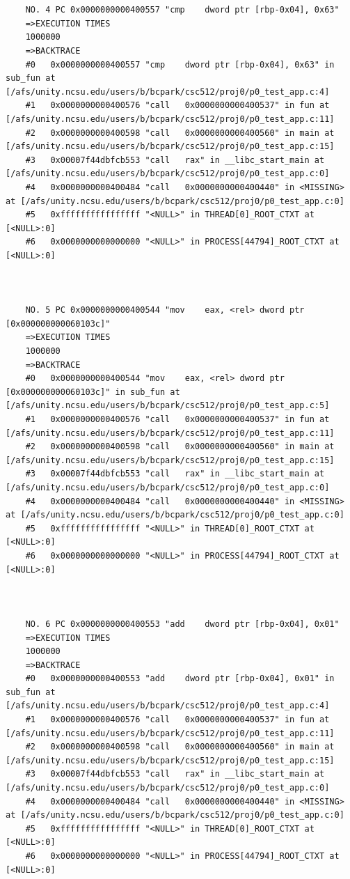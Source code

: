 \documentclass[11pt]{article}
\begin{document}
\begin{verbatim}
    
    
    NO. 4 PC 0x0000000000400557 "cmp    dword ptr [rbp-0x04], 0x63"
    =>EXECUTION TIMES
    1000000
    =>BACKTRACE
    #0   0x0000000000400557 "cmp    dword ptr [rbp-0x04], 0x63" in sub_fun at [/afs/unity.ncsu.edu/users/b/bcpark/csc512/proj0/p0_test_app.c:4]
    #1   0x0000000000400576 "call   0x0000000000400537" in fun at [/afs/unity.ncsu.edu/users/b/bcpark/csc512/proj0/p0_test_app.c:11]
    #2   0x0000000000400598 "call   0x0000000000400560" in main at [/afs/unity.ncsu.edu/users/b/bcpark/csc512/proj0/p0_test_app.c:15]
    #3   0x00007f44dbfcb553 "call   rax" in __libc_start_main at [/afs/unity.ncsu.edu/users/b/bcpark/csc512/proj0/p0_test_app.c:0]
    #4   0x0000000000400484 "call   0x0000000000400440" in <MISSING> at [/afs/unity.ncsu.edu/users/b/bcpark/csc512/proj0/p0_test_app.c:0]
    #5   0xffffffffffffffff "<NULL>" in THREAD[0]_ROOT_CTXT at [<NULL>:0]
    #6   0x0000000000000000 "<NULL>" in PROCESS[44794]_ROOT_CTXT at [<NULL>:0]
    
    
    
    NO. 5 PC 0x0000000000400544 "mov    eax, <rel> dword ptr [0x000000000060103c]"
    =>EXECUTION TIMES
    1000000
    =>BACKTRACE
    #0   0x0000000000400544 "mov    eax, <rel> dword ptr [0x000000000060103c]" in sub_fun at [/afs/unity.ncsu.edu/users/b/bcpark/csc512/proj0/p0_test_app.c:5]
    #1   0x0000000000400576 "call   0x0000000000400537" in fun at [/afs/unity.ncsu.edu/users/b/bcpark/csc512/proj0/p0_test_app.c:11]
    #2   0x0000000000400598 "call   0x0000000000400560" in main at [/afs/unity.ncsu.edu/users/b/bcpark/csc512/proj0/p0_test_app.c:15]
    #3   0x00007f44dbfcb553 "call   rax" in __libc_start_main at [/afs/unity.ncsu.edu/users/b/bcpark/csc512/proj0/p0_test_app.c:0]
    #4   0x0000000000400484 "call   0x0000000000400440" in <MISSING> at [/afs/unity.ncsu.edu/users/b/bcpark/csc512/proj0/p0_test_app.c:0]
    #5   0xffffffffffffffff "<NULL>" in THREAD[0]_ROOT_CTXT at [<NULL>:0]
    #6   0x0000000000000000 "<NULL>" in PROCESS[44794]_ROOT_CTXT at [<NULL>:0]
    
    
    
    NO. 6 PC 0x0000000000400553 "add    dword ptr [rbp-0x04], 0x01"
    =>EXECUTION TIMES
    1000000
    =>BACKTRACE
    #0   0x0000000000400553 "add    dword ptr [rbp-0x04], 0x01" in sub_fun at [/afs/unity.ncsu.edu/users/b/bcpark/csc512/proj0/p0_test_app.c:4]
    #1   0x0000000000400576 "call   0x0000000000400537" in fun at [/afs/unity.ncsu.edu/users/b/bcpark/csc512/proj0/p0_test_app.c:11]
    #2   0x0000000000400598 "call   0x0000000000400560" in main at [/afs/unity.ncsu.edu/users/b/bcpark/csc512/proj0/p0_test_app.c:15]
    #3   0x00007f44dbfcb553 "call   rax" in __libc_start_main at [/afs/unity.ncsu.edu/users/b/bcpark/csc512/proj0/p0_test_app.c:0]
    #4   0x0000000000400484 "call   0x0000000000400440" in <MISSING> at [/afs/unity.ncsu.edu/users/b/bcpark/csc512/proj0/p0_test_app.c:0]
    #5   0xffffffffffffffff "<NULL>" in THREAD[0]_ROOT_CTXT at [<NULL>:0]
    #6   0x0000000000000000 "<NULL>" in PROCESS[44794]_ROOT_CTXT at [<NULL>:0]
    

\end{verbatim}
\end{document}
